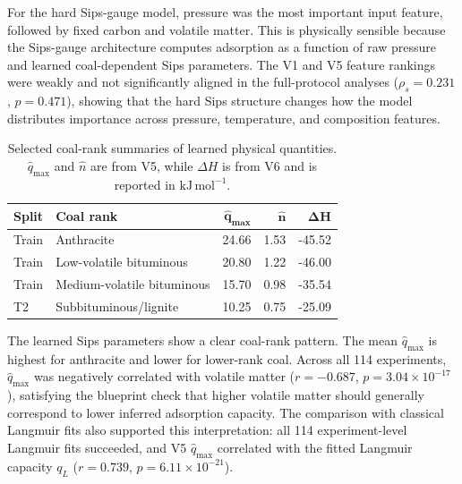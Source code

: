 \documentclass[11pt]{article}
\begin{document}
For the hard Sips-gauge model, pressure was the most important input feature,
followed by fixed carbon and volatile matter. This is physically sensible
because the Sips-gauge architecture computes adsorption as a function of raw
pressure and learned coal-dependent Sips parameters. The V1 and V5 feature
rankings were weakly and not significantly aligned in the full-protocol analyses
(\(\rho_s=0.231\), \(p=0.471\)), showing that the hard Sips structure changes
how the model distributes importance across pressure, temperature, and
composition features.

\begin{table}[htbp]
    \centering
    \small
    \begin{tabular}{@{}llrrr@{}}
        \toprule
        \textbf{Split} & \textbf{Coal rank}         & \(\boldsymbol{\hat{q}_{\max}}\)
                       & \(\boldsymbol{\hat{n}}\)   & \(\boldsymbol{\Delta H}\)                       \\
        \midrule
        Train          & Anthracite                 & 24.66                           & 1.53 & -45.52 \\
        Train          & Low-volatile bituminous    & 20.80                           & 1.22 & -46.00 \\
        Train          & Medium-volatile bituminous & 15.70                           & 0.98 & -35.54 \\
        T2             & Subbituminous/lignite      & 10.25                           & 0.75 & -25.09 \\
        \bottomrule
    \end{tabular}
    \caption{Selected coal-rank summaries of learned physical quantities.
        \(\hat{q}_{\max}\) and \(\hat{n}\) are from V5, while
        \(\Delta H\) is from V6 and is reported in
        \(\mathrm{kJ\,mol^{-1}}\).}
    \label{tab:learned-physical-parameters}
\end{table}

The learned Sips parameters show a clear coal-rank pattern. The mean
\(\hat{q}_{\max}\) is highest for anthracite and lower for lower-rank coal.
Across all 114 experiments, \(\hat{q}_{\max}\) was negatively correlated with
volatile matter (\(r=-0.687\), \(p=3.04\times10^{-17}\)), satisfying the
blueprint check that higher volatile matter should generally correspond to
lower inferred adsorption capacity. The comparison with classical Langmuir
fits also supported this interpretation: all 114 experiment-level Langmuir
fits succeeded, and V5 \(\hat{q}_{\max}\) correlated with the fitted Langmuir
capacity \(q_L\) (\(r=0.739\), \(p=6.11\times10^{-21}\)).
\end{document}
